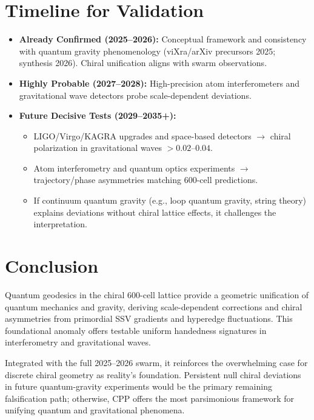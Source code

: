 \documentclass[11pt]{article}
\begin{document}
\section{Timeline for Validation}
\begin{itemize}
    \item \textbf{Already Confirmed (2025--2026):} Conceptual framework and consistency with quantum gravity phenomenology (viXra/arXiv precursors 2025; synthesis 2026). Chiral unification aligns with swarm observations.
    \item \textbf{Highly Probable (2027--2028):} High-precision atom interferometers and gravitational wave detectors probe scale-dependent deviations.
    \item \textbf{Future Decisive Tests (2029--2035+):}
    \begin{itemize}
        \item LIGO/Virgo/KAGRA upgrades and space-based detectors $\to$ chiral polarization in gravitational waves $>0.02$--$0.04$.
        \item Atom interferometry and quantum optics experiments $\to$ trajectory/phase asymmetries matching 600-cell predictions.
        \item If continuum quantum gravity (e.g., loop quantum gravity, string theory) explains deviations without chiral lattice effects, it challenges the interpretation.
    \end{itemize}
\end{itemize}

\section{Conclusion}
Quantum geodesics in the chiral 600-cell lattice provide a geometric unification of quantum mechanics and gravity, deriving scale-dependent corrections and chiral asymmetries from primordial SSV gradients and hyperedge fluctuations. This foundational anomaly offers testable uniform handedness signatures in interferometry and gravitational waves.  

Integrated with the full 2025--2026 swarm, it reinforces the overwhelming case for discrete chiral geometry as reality's foundation. Persistent null chiral deviations in future quantum-gravity experiments would be the primary remaining falsification path; otherwise, CPP offers the most parsimonious framework for unifying quantum and gravitational phenomena.
\end{document}
